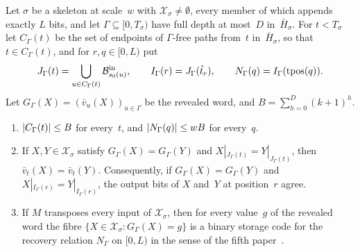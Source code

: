 \begin{lemma}\label{lem:skel-cones}
Let $\sigma$ be a skeleton at scale~$w$ with $\mathcal X_\sigma\neq\emptyset$, every member of which appends exactly $L$
bits, and let $\Gamma\subseteq[0,T_\sigma)$ have full depth at most~$D$ in~$\bar H_\sigma$. For $t<T_\sigma$ let
$C_\Gamma(t)$ be the set of endpoints of $\Gamma$-free paths from~$t$ in~$\bar H_\sigma$, so that $t\in C_\Gamma(t)$,
and for $r,q\in[0,L)$ put
\[
  J_\Gamma(t)=\bigcup_{u\in C_\Gamma(t)}\mathcal B^{\mathrm{in}}_{s_0(u)},\qquad I_\Gamma(r)=J_\Gamma(\hat t_r),\qquad
  N_\Gamma(q)=I_\Gamma(\operatorname{tpos}(q)).
\]
Let $G_\Gamma(X)=(\bar v_u(X))_{u\in\Gamma}$ be the revealed word, and $B=\sum_{h=0}^D(k+1)^h$.
\begin{enumerate}[label=(\alph*)]
\item $\lvert C_\Gamma(t) \rvert\le B$ for every~$t$, and $\lvert N_\Gamma(q) \rvert\le wB$ for every~$q$.
\item If $X,Y\in\mathcal X_\sigma$ satisfy $G_\Gamma(X)=G_\Gamma(Y)$ and $X|_{J_\Gamma(t)}=Y|_{J_\Gamma(t)}$, then
$\bar v_t(X)=\bar v_t(Y)$. Consequently, if $G_\Gamma(X)=G_\Gamma(Y)$ and $X|_{I_\Gamma(r)}=Y|_{I_\Gamma(r)}$, the
output bits of $X$ and~$Y$ at position~$r$ agree.
\item If $M$ transposes every input of $\mathcal X_\sigma$, then for every value~$g$ of the revealed word the fibre
$\{X\in\mathcal X_\sigma:G_\Gamma(X)=g\}$ is a binary storage code for the recovery relation $N_\Gamma$ on $[0,L)$ in
the sense of the fifth paper~\cite[Definition~2.1]{DirectedRecovery2026}.
\end{enumerate}
\end{lemma}

